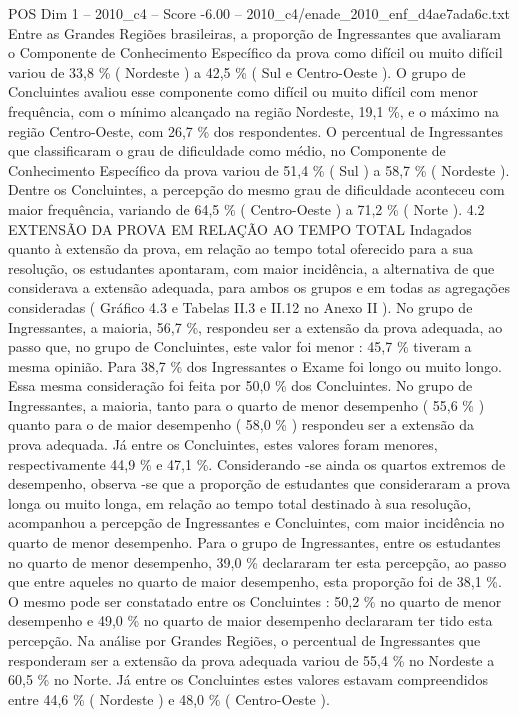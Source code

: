 \begin{textsample}{POS Dim 1 – 2010\_c4 – Score -6.00 – 2010\_c4/enade\_2010\_enf\_d4ae7ada6c.txt}
Entre as Grandes Regiões brasileiras, a proporção de Ingressantes que avaliaram o Componente de Conhecimento Específico da prova como difícil ou muito difícil variou de 33,8 \% ( Nordeste ) a 42,5 \% ( Sul e Centro-Oeste ).
O grupo de Concluintes avaliou esse componente como difícil ou muito difícil com menor frequência, com o mínimo alcançado na região Nordeste, 19,1 \%, e o máximo na região Centro-Oeste, com 26,7 \% dos respondentes.
O percentual de Ingressantes que classificaram o grau de dificuldade como médio, no Componente de Conhecimento Específico da prova variou de 51,4 \% ( Sul ) a 58,7 \% ( Nordeste ).
Dentre os Concluintes, a percepção do mesmo grau de dificuldade aconteceu com maior frequência, variando de 64,5 \% ( Centro-Oeste ) a 71,2 \% ( Norte ). 4.2 EXTENSÃO DA PROVA EM RELAÇÃO AO TEMPO TOTAL Indagados quanto à extensão da prova, em relação ao tempo total oferecido para a sua resolução, os estudantes apontaram, com maior incidência, a alternativa de que considerava a extensão adequada, para ambos os grupos e em todas as agregações consideradas ( Gráfico 4.3 e Tabelas II.3 e II.12 no Anexo II ).
No grupo de Ingressantes, a maioria, 56,7 \%, respondeu ser a extensão da prova adequada, ao passo que, no grupo de Concluintes, este valor foi menor : 45,7 \% tiveram a mesma opinião.
Para 38,7 \% dos Ingressantes o Exame foi longo ou muito longo.
Essa mesma consideração foi feita por 50,0 \% dos Concluintes.
No grupo de Ingressantes, a maioria, tanto para o quarto de menor desempenho ( 55,6 \% ) quanto para o de maior desempenho ( 58,0 \% ) respondeu ser a extensão da prova adequada.
Já entre os Concluintes, estes valores foram menores, respectivamente 44,9 \% e 47,1 \%.
Considerando -se ainda os quartos extremos de desempenho, observa -se que a proporção de estudantes que consideraram a prova longa ou muito longa, em relação ao tempo total destinado à sua resolução, acompanhou a percepção de Ingressantes e Concluintes, com maior incidência no quarto de menor desempenho.
Para o grupo de Ingressantes, entre os estudantes no quarto de menor desempenho, 39,0 \% declararam ter esta percepção, ao passo que entre aqueles no quarto de maior desempenho, esta proporção foi de 38,1 \%.
O mesmo pode ser constatado entre os Concluintes : 50,2 \% no quarto de menor desempenho e 49,0 \% no quarto de maior desempenho declararam ter tido esta percepção.
Na análise por Grandes Regiões, o percentual de Ingressantes que responderam ser a extensão da prova adequada variou de 55,4 \% no Nordeste a 60,5 \% no Norte.
Já entre os Concluintes estes valores estavam compreendidos entre 44,6 \% ( Nordeste ) e 48,0 \% ( Centro-Oeste ).

\end{textsample}
